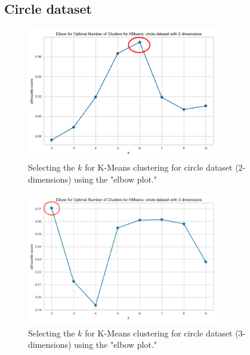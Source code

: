 \subsection{Circle dataset}

\begin{figure}[H]
  \includegraphics[width=0.75\textwidth]{Appendix//parameter-selection/circle-dataset-2-kmeans.png}
  \caption{Selecting the $k$ for K-Means clustering for circle dataset (2-dimensions) using the "elbow plot."}
  \label{hyperparameters:agglomerative-circle-dataset-2d}
\end{figure}
\begin{figure}[H]
  \includegraphics[width=0.75\textwidth]{Appendix//parameter-selection/circle-dataset-3-kmeans.png}
  \caption{Selecting the $k$ for K-Means clustering for circle dataset (3-dimensions) using the "elbow plot."}
  \label{hyperparameters:agglomerative-circle-dataset-3d}
\end{figure}
\newpage

